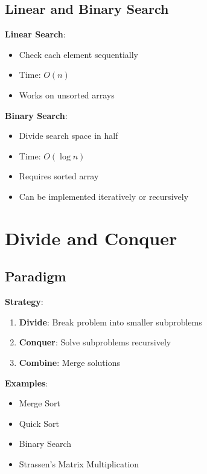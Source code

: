 \documentclass[12pt,a4paper]{report}
\begin{document}
\subsection{Linear and Binary Search}
\begin{concept}
\textbf{Linear Search}:
\begin{itemize}
    \item Check each element sequentially
    \item Time: $O(n)$
    \item Works on unsorted arrays
\end{itemize}

\textbf{Binary Search}:
\begin{itemize}
    \item Divide search space in half
    \item Time: $O(\log n)$
    \item Requires sorted array
    \item Can be implemented iteratively or recursively
\end{itemize}
\end{concept}

\section{Divide and Conquer}

\subsection{Paradigm}
\begin{concept}
\textbf{Strategy}:
\begin{enumerate}
    \item \textbf{Divide}: Break problem into smaller subproblems
    \item \textbf{Conquer}: Solve subproblems recursively
    \item \textbf{Combine}: Merge solutions
\end{enumerate}

\textbf{Examples}:
\begin{itemize}
    \item Merge Sort
    \item Quick Sort
    \item Binary Search
    \item Strassen's Matrix Multiplication
\end{itemize}
\end{concept}
\end{document}

